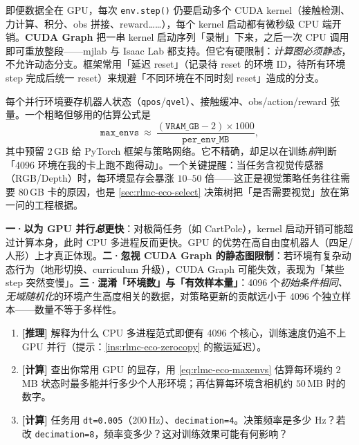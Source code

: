 即便数据全在 GPU，每次 \verb|env.step()| 仍要启动多个 CUDA kernel（接触检测、力计算、积分、obs 拼接、reward……），每个 kernel 启动都有微秒级 CPU 端开销。\textbf{CUDA Graph} 把一串 kernel 启动序列「录制」下来，之后一次 CPU 调用即可重放整段——mjlab 与 Isaac Lab 都支持。但它有硬限制：\emph{计算图必须静态}，不允许动态分支。框架常用「延迟 reset」（记录待 reset 的环境 ID，待所有环境 step 完成后统一 reset）来规避「不同环境在不同时刻 reset」造成的分支。

\begin{insight}\label{ins:rlmc-eco-vram}
每个并行环境要存机器人状态（\verb|qpos|/\verb|qvel|）、接触缓冲、obs/action/reward 张量。一个粗略但够用的估算公式是
\begin{equation}
\texttt{max\_envs}\ \approx\ \frac{(\texttt{VRAM\_GB}-2)\times 1000}{\texttt{per\_env\_MB}},
\label{eq:rlmc-eco-maxenvs}
\end{equation}
其中预留 $2\,$GB 给 PyTorch 框架与策略网络。它不精确，却足以在训练\emph{前}判断「4096 环境在我的卡上跑不跑得动」。一个关键提醒：当任务含视觉传感器（RGB/Depth）时，每环境显存会暴涨 $10$--$50$ 倍——这正是视觉策略任务往往需要 $80\,$GB 卡的原因，也是 \cref{sec:rlmc-eco-select} 决策树把「是否需要视觉」放在第一问的工程根据。
\end{insight}

\begin{pitfall}
\textbf{一·以为 GPU 并行\emph{总}更快}：对极简任务（如 CartPole），kernel 启动开销可能超过计算本身，此时 CPU 多进程反而更快。GPU 的优势在高自由度机器人（四足/人形）上才真正体现。\textbf{二·忽视 CUDA Graph 的静态图限制}：若环境有复杂动态行为（地形切换、curriculum 升级），CUDA Graph 可能失效，表现为「某些 step 突然变慢」。\textbf{三·混淆「环境数」与「有效样本量」}：4096 个\emph{初始条件相同、无域随机化}的环境产生高度相关的数据，对策略更新的贡献远小于 4096 个独立样本——数量不等于多样性。
\end{pitfall}

\begin{practice}[练习·GPU 并行]
\begin{enumerate}
  \item \textbf{[推理]} 解释为什么 CPU 多进程范式即便有 4096 个核心，训练速度仍追不上 GPU 并行（提示：\cref{ins:rlmc-eco-zerocopy} 的搬运延迟）。
  \item \textbf{[计算]} 查出你常用 GPU 的显存，用 \cref{eq:rlmc-eco-maxenvs} 估算每环境约 $2\,$MB 状态时最多能并行多少个人形环境；再估算每环境含相机约 $50\,$MB 时的数字。
  \item \textbf{[计算]} 任务用 \verb|dt=0.005|（$200\,$Hz）、\verb|decimation=4|。决策频率是多少 Hz？若改 \verb|decimation=8|，频率变多少？这对训练效果可能有何影响？
\end{enumerate}
\end{practice}

